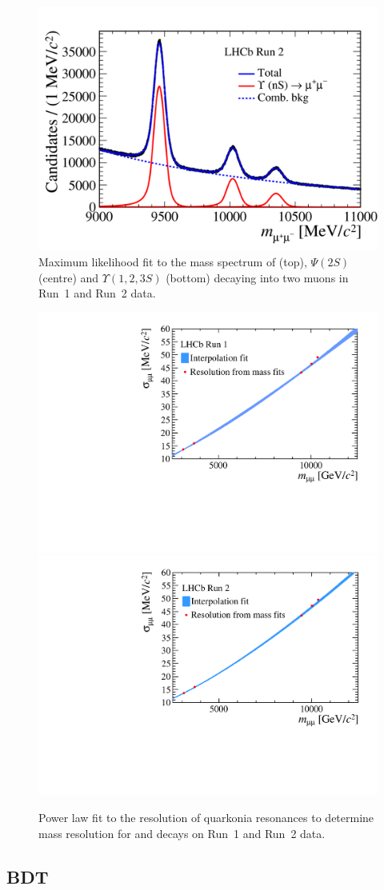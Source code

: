 \begin{figure}[tbp]
     \includegraphics[width= 0.49 \textwidth]{./Figs/BFAnalysis/hidef_Fig13bot.png}
     \caption{Maximum likelihood fit to the mass spectrum of \jpsi (top), $\Psi (2S)$ (centre) and $\Upsilon(1, 2, 3S)$ (bottom) decaying into two muons in Run~1 and Run~2 data.}
     \label{fig:quarkonia}
\end{figure}

\begin{figure}[tbp]
    \centering
     \includegraphics[width= 0.49 \textwidth]{./Figs/BFAnalysis/Run1_res.pdf}
     \includegraphics[width= 0.49 \textwidth]{./Figs/BFAnalysis/Run2_res.pdf}
     \caption{Power law fit to the resolution of quarkonia resonances to determine mass resolution for \bdmumu and \bsmumu decays on Run~1 and Run~2 data.}
     \label{fig:interp}
\end{figure}

\subsection{BDT \pdfs}
\label{sec:ADGBDTcorrections}                                                                                                                

